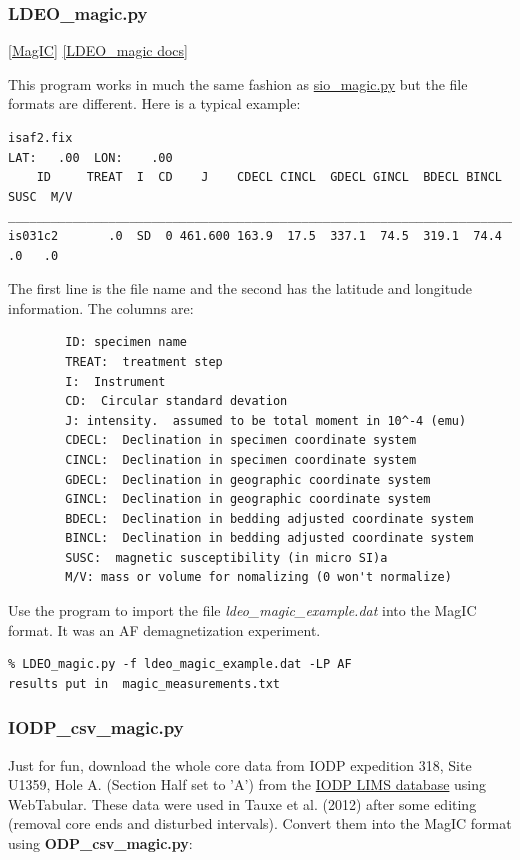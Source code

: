 \documentclass[11pt]{book}
\begin{document}
{{{
\subsubsection{LDEO\_magic.py}
\href{#MagIC}{[MagIC]}
\href{http://earthref.org/PmagPy/pmagpydocs/LDEO_magic-module.html}{[LDEO\_magic docs]}


This program works in much the same fashion as \href{#sio_magic.py}{sio\_magic.py} but the file formats are different.  Here is a typical example: 

\begin{verbatim}
isaf2.fix       
LAT:   .00  LON:    .00
    ID     TREAT  I  CD    J    CDECL CINCL  GDECL GINCL  BDECL BINCL  SUSC  M/V
________________________________________________________________________________
is031c2       .0  SD  0 461.600 163.9  17.5  337.1  74.5  319.1  74.4    .0   .0
\end{verbatim}
The first line is the file name and the second has the latitude and longitude information. The columns are:
\begin{verbatim}    
        ID: specimen name
        TREAT:  treatment step
        I:  Instrument
        CD:  Circular standard devation
        J: intensity.  assumed to be total moment in 10^-4 (emu)
        CDECL:  Declination in specimen coordinate system
        CINCL:  Declination in specimen coordinate system
        GDECL:  Declination in geographic coordinate system
        GINCL:  Declination in geographic coordinate system
        BDECL:  Declination in bedding adjusted coordinate system
        BINCL:  Declination in bedding adjusted coordinate system
        SUSC:  magnetic susceptibility (in micro SI)a
        M/V: mass or volume for nomalizing (0 won't normalize)
\end{verbatim}

Use the program to import the file {\it ldeo\_magic\_example.dat} into the MagIC format.  It was an AF demagnetization experiment.   

\begin{verbatim}
% LDEO_magic.py -f ldeo_magic_example.dat -LP AF
results put in  magic_measurements.txt
\end{verbatim}

\subsubsection{IODP\_csv\_magic.py}

Just for fun, download the whole core data from IODP expedition 318, Site U1359, Hole A. (Section Half set to 'A') from the \href{#LIMS}{IODP LIMS database} using WebTabular.    These data were used in Tauxe et al. (2012) \nocite{tauxe12} after some editing (removal core ends and disturbed intervals).   Convert them into the MagIC format using {\bf ODP\_csv\_magic.py}:

}}}
\end{document}
